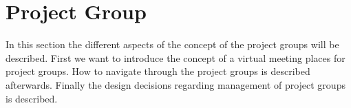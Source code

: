 \section{Project Group}
\label{sec:projectgroup}
In this section the different aspects of the concept of the project groups will be described.
First we want to introduce the concept of a virtual meeting places for project groups.
How to navigate through the project groups is described afterwards.
Finally the design decisions regarding management of project groups is described.








